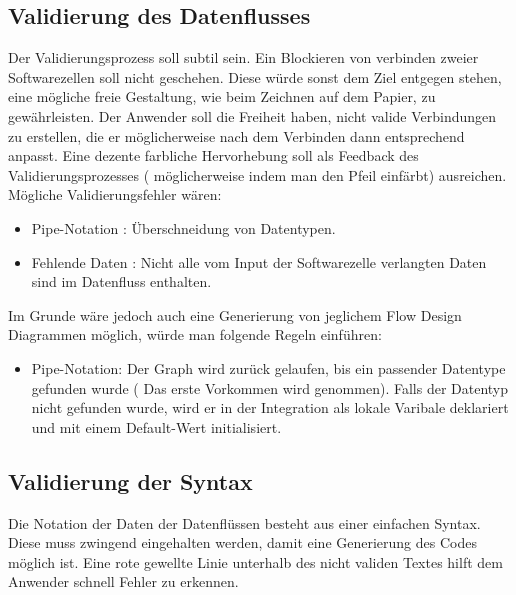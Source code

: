 \documentclass[11pt]{article}
\begin{document}
\subsection{Validierung des Datenflusses}
\label{sec:orgheadline18}
Der Validierungsprozess soll subtil sein. Ein Blockieren von verbinden zweier
Softwarezellen soll nicht geschehen. Diese würde sonst dem Ziel entgegen stehen, 
eine mögliche freie Gestaltung, wie beim Zeichnen auf dem Papier, zu
gewährleisten. Der Anwender soll die Freiheit haben, nicht valide Verbindungen
zu erstellen, die er möglicherweise nach dem Verbinden dann entsprechend
anpasst. Eine dezente farbliche Hervorhebung soll als Feedback des
Validierungsprozesses ( möglicherweise indem man den Pfeil einfärbt) ausreichen. Mögliche Validierungsfehler wären:
\begin{itemize}
\item Pipe-Notation : Überschneidung von Datentypen.
\item Fehlende Daten : Nicht alle vom Input der Softwarezelle verlangten Daten
sind im Datenfluss enthalten.
\end{itemize}

Im Grunde wäre jedoch auch eine Generierung von jeglichem Flow Design Diagrammen
möglich, würde man folgende Regeln einführen:
\begin{itemize}
\item Pipe-Notation: Der Graph wird zurück gelaufen, bis ein passender Datentype
gefunden wurde ( Das erste Vorkommen wird genommen). Falls der Datentyp nicht
gefunden wurde, wird er in der Integration als lokale Varibale deklariert und mit einem
Default-Wert initialisiert.
\end{itemize}

\subsection{Validierung der Syntax}
\label{sec:orgheadline19}
Die Notation der Daten der Datenflüssen besteht aus einer einfachen Syntax. Diese muss zwingend eingehalten
 werden, damit eine Generierung des Codes möglich ist.
 Eine rote gewellte Linie unterhalb des nicht validen Textes hilft dem Anwender
 schnell Fehler zu erkennen.
\end{document}
